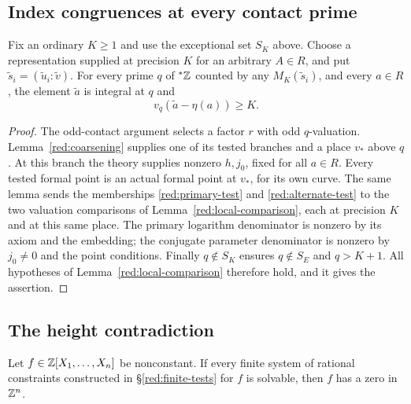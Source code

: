 \subsection{Index congruences at every contact prime}
\label{red:indices}

\begin{proposition}\label{red:index-congruence}
Fix an ordinary \(K\ge1\) and use the exceptional set \(S_K\) above.
Choose a representation supplied at precision \(K\) for an arbitrary
\(A\in R\), and put
\(\widetilde s_i=(\widetilde u_i:\widetilde v)\).
For every prime \(q\) of \({}^*\mathbb Z\) counted by any
\(M_K(\widetilde s_i)\), and every \(a\in R\), the element
\(\widetilde a\) is integral at \(q\) and
\begin{equation}\label{red:index-congruence-equation}
                         v_q(\widetilde a-\eta(a))\ge K.
\end{equation}
\end{proposition}

\begin{proof}
The odd-contact argument selects a factor \(r\) with odd
\(q\)-valuation. Lemma~\ref{red:coarsening} supplies one of its tested
branches and a place \(v_*\) above \(q\). At this branch the theory
supplies nonzero \(h,j_0\), fixed for all \(a\in R\).
Every tested formal point is an actual formal point at \(v_*\), for
its own curve. The same lemma sends the memberships
\eqref{red:primary-test} and \eqref{red:alternate-test} to the two
valuation comparisons of Lemma~\ref{red:local-comparison}, each at
precision \(K\) and at this same place. The primary logarithm denominator
is nonzero by its axiom and the embedding; the conjugate parameter
denominator is nonzero by \(j_0\ne0\) and the point conditions.
Finally \(q\notin S_K\) ensures \(q\notin S_E\) and \(q>K+1\).
All hypotheses of Lemma~\ref{red:local-comparison} therefore hold,
and it gives the assertion.
\end{proof}

\subsection{The height contradiction}
\label{red:height-contradiction}

\begin{proposition}\label{red:finite-test-success}
Let $f\in\mathbb Z[X_1,\ldots,X_n]$ be nonconstant. If every finite system
of rational constraints constructed in \S\ref{red:finite-tests} for
$f$ is solvable, then $f$ has a zero in $\mathbb Z^n$.
\end{proposition}

